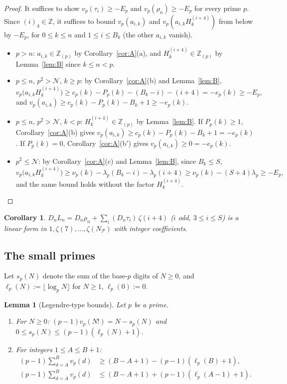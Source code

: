 \documentclass[11pt]{amsart}
\newtheorem{lemma}[theorem]{Lemma}
\newtheorem{corollary}[theorem]{Corollary}
\theoremstyle{definition}
\theoremstyle{remark}
\numberwithin{equation}{section}
\newcommand{\ZZ}{\mathbb{Z}}
\newcommand{\cN}{\mathcal{N}}
\newcommand{\cP}{\mathcal{P}}
\begin{document}
\begin{proof}
It suffices to show $v_p(\tau_i)\ge -E_p$ and $v_p(\rho_n)\ge-E_p$ for every prime $p$. Since $(i)_4\in\ZZ$, it
suffices to bound $v_p(a_{i,k})$ and $v_p(a_{i,k}H_k^{(i+4)})$ from below by $-E_p$, for $0\le k\le n$ and
$1\le i\le B_k$ (the other $a_{i,k}$ vanish).
\begin{itemize}
\item $p>n$: $a_{i,k}\in\ZZ_{(p)}$ by Corollary~\ref{cor:A}(a), and $H_k^{(i+4)}\in\ZZ_{(p)}$ by
  Lemma~\ref{lem:B} since $k\le n<p$.
\item $p\le n$, $p^2>\cN$, $k\ge p$: by Corollary~\ref{cor:A}(b) and Lemma~\ref{lem:B},
  \[
    v_p\bigl(a_{i,k}H_k^{(i+4)}\bigr)\ge c_p(k)-P_p(k)-(B_k-i)-(i+4)=-e_p(k)\ge-E_p,
  \]
  and $v_p(a_{i,k})\ge c_p(k)-P_p(k)-B_k+1\ge-e_p(k)$.
\item $p\le n$, $p^2>\cN$, $k<p$: $H_k^{(i+4)}\in\ZZ_{(p)}$ by Lemma~\ref{lem:B}. If $P_p(k)\ge1$,
  Corollary~\ref{cor:A}(b) gives $v_p(a_{i,k})\ge c_p(k)-P_p(k)-B_k+1=-e_p(k)$. If $P_p(k)=0$,
  Corollary~\ref{cor:A}(b$'$) gives $v_p(a_{i,k})\ge0=-e_p(k)$.
\item $p^2\le\cN$: by Corollary~\ref{cor:A}(c) and Lemma~\ref{lem:B}, since $B_k\le S$,
  \[
    v_p\bigl(a_{i,k}H_k^{(i+4)}\bigr)\ge\nu_p(k)-\lambda_p(B_k-i)-\lambda_p(i+4)\ge\nu_p(k)-(S+4)\lambda_p\ge-E_p,
  \]
  and the same bound holds without the factor $H_k^{(i+4)}$.\qedhere
\end{itemize}
\end{proof}

\begin{corollary}\label{cor:intform}
$D_nL_n=D_n\rho_n+\sum_{i}(D_n\tau_i)\,\zeta(i+4)$ ($i$ odd, $3\le i\le S$) is a linear form in
$1,\zeta(7),\dots,\zeta(N_\cP)$ with integer coefficients.
\end{corollary}

\subsection{The small primes}

Let $s_p(N)$ denote the sum of the base-$p$ digits of $N\ge0$, and $\ell_p(N):=\lfloor\log_pN\rfloor$ for
$N\ge1$, $\ell_p(0):=0$.

\begin{lemma}[Legendre-type bounds]\label{lem:legendre}
Let $p$ be a prime.
\begin{enumerate}
\item For $N\ge0$: $(p-1)v_p(N!)=N-s_p(N)$ and $0\le s_p(N)\le(p-1)(\ell_p(N)+1)$.
\item For integers $1\le A\le B+1$:
  \begin{align*}
    (p-1)\sum_{d=A}^{B}v_p(d)&\ge(B-A+1)-(p-1)(\ell_p(B)+1),\\
    (p-1)\sum_{d=A}^{B}v_p(d)&\le(B-A+1)+(p-1)(\ell_p(A-1)+1).
  \end{align*}
\end{enumerate}
\end{lemma}
\end{document}
